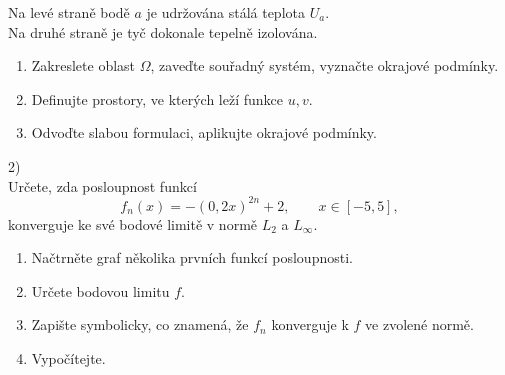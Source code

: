 \documentclass{article}
\begin{document}
Na levé straně bodě $a$ je udržována stálá teplota $U_a$.\\
Na druhé straně je tyč dokonale tepelně izolována.

\begin{enumerate}
\item Zakreslete oblast $\Omega$, zaveďte souřadný systém, vyznačte okrajové podmínky.
\item Definujte prostory, ve kterých leží funkce $u,v$.
\item Odvoďte slabou formulaci, aplikujte okrajové podmínky.
\end{enumerate}




\vspace{1cm}

2)\\
\noindent
Určete, zda posloupnost funkcí
\[
f_n(x) = -\left( 0,2x \right)^{2n}+2, \qquad x\in[-5,5],
\]
konverguje ke své bodové limitě v normě $L_2$ a $L_\infty$.

\vspace{2cm}

\begin{enumerate}
\item Načtrněte graf několika prvních funkcí posloupnosti.
\item Určete bodovou limitu $f$.
\item Zapište symbolicky, co znamená, že $f_n$ konverguje k $f$ ve zvolené normě.
\item Vypočítejte.
\end{enumerate}
\end{document}
